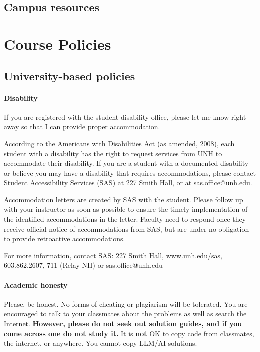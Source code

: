 \documentclass[11pt]{article}
\begin{document}
\subsection{Campus resources}

\section{Course Policies}

\subsection{University-based policies}

\paragraph{Disability}

If you are registered with the student disability office, please let me know right away so that I can provide proper accommodation.

According to the Americans with Disabilities Act (as amended, 2008), each student with a disability has the right to request services from UNH to accommodate their disability. If you are a student with a documented disability or believe you may have a disability that requires accommodations, please contact Student Accessibility Services (SAS) at 227 Smith Hall, or at sas.office@unh.edu.

Accommodation letters are created by SAS with the student. Please follow up with your instructor as soon as possible to ensure the timely implementation of the identified accommodations in the letter. Faculty need to respond once they receive official notice of accommodations from SAS, but are under no obligation to provide retroactive accommodations.

For more information, contact SAS: 227 Smith Hall, \url{www.unh.edu/sas}, 603.862.2607, 711 (Relay NH) or sas.office@unh.edu

\paragraph{Academic honesty}

Please, be honest. No forms of cheating or plagiarism will be tolerated. You are encouraged to talk to your classmates about the problems as well as search the Internet. \textbf{However, please do not seek out solution guides, and if you come across one do not study it.} It is \textbf{not} OK to copy code from classmates, the internet, or anywhere. You cannot copy LLM/AI solutions.  
\end{document}
